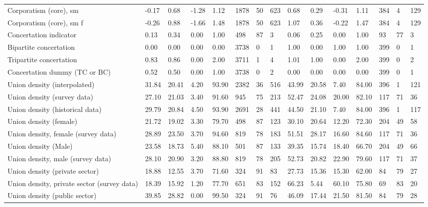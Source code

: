 \begin{longtable}{lllllllllllllll}
\addlinespace
Corporatism (core), sm & -0.17 & 0.68 & -1.28 & 1.12 & 1878 & 50 & 623 & 0.68 & 0.29 & -0.31 & 1.11 & 384 & 4 & 129\\
Corporatism (core), sm f & -0.26 & 0.88 & -1.66 & 1.48 & 1878 & 50 & 623 & 1.07 & 0.36 & -0.22 & 1.47 & 384 & 4 & 129\\
Concertation indicator & 0.13 & 0.34 & 0.00 & 1.00 & 498 & 87 & 3 & 0.06 & 0.25 & 0.00 & 1.00 & 93 & 77 & 3\\
Bipartite concertation & 0.00 & 0.00 & 0.00 & 0.00 & 3738 & 0 & 1 & 1.00 & 0.00 & 1.00 & 1.00 & 399 & 0 & 1\\
Tripartite concertation & 0.83 & 0.86 & 0.00 & 2.00 & 3711 & 1 & 4 & 1.01 & 1.00 & 0.00 & 2.00 & 399 & 0 & 2\\
\addlinespace
Concertation dummy (TC or BC) & 0.52 & 0.50 & 0.00 & 1.00 & 3738 & 0 & 2 & 0.00 & 0.00 & 0.00 & 0.00 & 399 & 0 & 1\\
Union density (interpolated) & 31.84 & 20.41 & 4.20 & 93.90 & 2382 & 36 & 516 & 43.99 & 20.58 & 7.40 & 84.00 & 396 & 1 & 121\\
Union density (survey data) & 27.10 & 21.03 & 3.40 & 91.60 & 945 & 75 & 213 & 52.47 & 24.08 & 20.00 & 82.10 & 117 & 71 & 36\\
Union density (historical data) & 29.79 & 20.84 & 4.50 & 93.90 & 2691 & 28 & 441 & 44.50 & 21.10 & 7.40 & 84.00 & 396 & 1 & 117\\
Union density (female) & 21.72 & 19.02 & 3.30 & 79.70 & 498 & 87 & 123 & 30.10 & 20.64 & 12.20 & 72.30 & 204 & 49 & 58\\
\addlinespace
Union density, female (survey data) & 28.89 & 23.50 & 3.70 & 94.60 & 819 & 78 & 183 & 51.51 & 28.17 & 16.60 & 84.60 & 117 & 71 & 36\\
Union density (Male) & 23.58 & 18.73 & 5.40 & 88.10 & 501 & 87 & 133 & 39.35 & 15.74 & 18.40 & 66.70 & 204 & 49 & 66\\
Union density, male (survey data) & 28.10 & 20.90 & 3.20 & 88.80 & 819 & 78 & 205 & 52.73 & 20.82 & 22.90 & 79.60 & 117 & 71 & 37\\
Union density (private sector) & 18.88 & 12.55 & 3.70 & 71.60 & 324 & 91 & 83 & 27.73 & 15.36 & 15.30 & 62.00 & 84 & 79 & 27\\
Union density, private sector (survey data) & 18.39 & 15.92 & 1.20 & 77.70 & 651 & 83 & 152 & 66.23 & 5.44 & 60.10 & 75.80 & 69 & 83 & 20\\
\addlinespace
Union density (public sector) & 39.85 & 28.82 & 0.00 & 99.50 & 324 & 91 & 76 & 46.09 & 17.44 & 21.50 & 81.50 & 84 & 79 & 28\\

\end{longtable}
